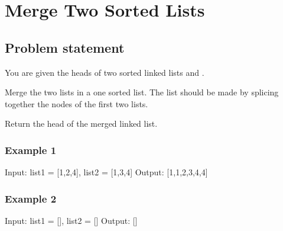 \documentclass[letterpaper,12pt,english]{book}
\begin{document}
\sphinxstepscope


\section{Merge Two Sorted Lists}
\label{\detokenize{Linked_List/02_LL_21_Merge_Two_Sorted_Lists:merge-two-sorted-lists}}\label{\detokenize{Linked_List/02_LL_21_Merge_Two_Sorted_Lists::doc}}

\subsection{Problem statement\sphinxfootnotemark[20]}
\label{\detokenize{Linked_List/02_LL_21_Merge_Two_Sorted_Lists:problem-statement}}%
\begin{footnotetext}[20]\sphinxAtStartFootnote
{}
%
\end{footnotetext}\ignorespaces 
\sphinxAtStartPar
You are given the heads of two sorted linked lists  and .

\sphinxAtStartPar
Merge the two lists in a one sorted list. The list should be made by splicing together the nodes of the first two lists.

\sphinxAtStartPar
Return the head of the merged linked list.


\subsubsection{Example 1}
\label{\detokenize{Linked_List/02_LL_21_Merge_Two_Sorted_Lists:example-1}}
\sphinxAtStartPar
{}

\begin{sphinxVerbatim}[commandchars=\\\{\}]
Input: list1 = [1,2,4], list2 = [1,3,4]
Output: [1,1,2,3,4,4]
\end{sphinxVerbatim}


\subsubsection{Example 2}
\label{\detokenize{Linked_List/02_LL_21_Merge_Two_Sorted_Lists:example-2}}
\begin{sphinxVerbatim}[commandchars=\\\{\}]
Input: list1 = [], list2 = []
Output: []
\end{sphinxVerbatim}
\end{document}
